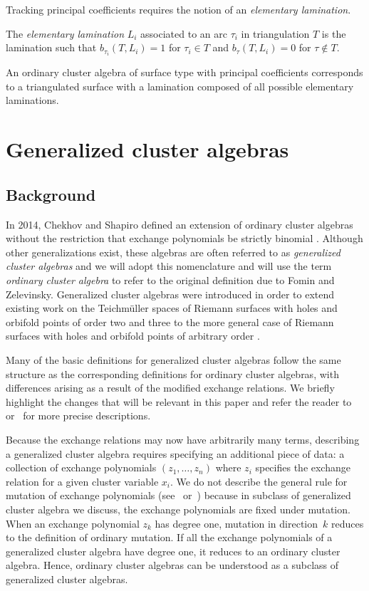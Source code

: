 \documentclass[11pt]{article}
\numberwithin{equation}{section}
\begin{document}
Tracking principal coefficients requires the notion of an \emph{elementary lamination}.

\begin{Definition}
The \emph{elementary lamination} $L_i$ associated to an arc $\tau_i$ in triangulation $T$ is the lamination such that $b_{\tau_i}(T,L_i) = 1$ for $\tau_i \in T$ and $b_\tau(T,L_i)=0$ for $\tau \not\in T$.
\end{Definition}

 An ordinary cluster algebra of surface type with principal coefficients corresponds to a triangulated surface with a lamination composed of all possible elementary laminations.

\section{Generalized cluster algebras}\label{sec:generalizedClusterAlgebras}

\subsection{Background}

In 2014, Chekhov and Shapiro defined an extension of ordinary cluster algebras \cite{Fomin-Zelevinsky-I} without the restriction that exchange polynomials be strictly binomial \cite{Chekhov-Shapiro}. Although other generalizations exist, these algebras are often referred to as \emph{generalized cluster algebras} and we will adopt this nomenclature and will use the term \emph{ordinary cluster algebra} to refer to the original definition due to Fomin and Zelevinsky. Generalized cluster algebras were introduced in order to extend existing work on the Teichm\"{u}ller spaces of Riemann surfaces with holes and orbifold points of order two and three to the more general case of Riemann surfaces with holes and orbifold points of arbitrary order \cite{Chekhov,Chekhov-Mazzocco-Yangians}.

Many of the basic definitions for generalized cluster algebras follow the same structure as the corresponding definitions for ordinary cluster algebras, with differences arising as a result of the modified exchange relations. We briefly highlight the changes that will be relevant in this paper and refer the reader to~\cite{Chekhov-Shapiro} or~\cite{Nakanishi} for more precise descriptions.

Because the exchange relations may now have arbitrarily many terms, describing a generalized cluster algebra requires specifying an additional piece of data: a collection of exchange polynomials $(z_1,\dots,z_n)$ where $z_i$ specifies the exchange relation for a given cluster variable $x_i$. We do not describe the general rule for mutation of exchange polynomials (see~\cite{Chekhov-Shapiro} or~\cite{Nakanishi}) because in subclass of generalized cluster algebra we discuss, the exchange polynomials are fixed under mutation. When an exchange polynomial $z_k$ has degree one, mutation in direction~$k$ reduces to the definition of ordinary mutation. If all the exchange polynomials of a generalized cluster algebra have degree one, it reduces to an ordinary cluster algebra. Hence, ordinary cluster algebras can be understood as a subclass of generalized cluster algebras.
\end{document}
